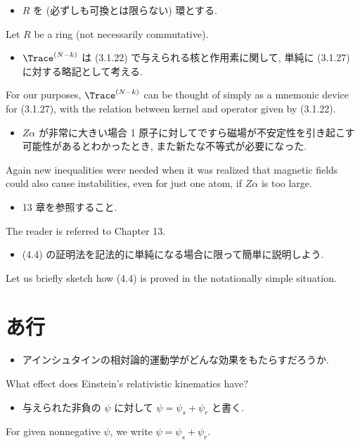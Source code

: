 \documentclass[openany, a4paper, oneside]{jsbook}
\begin{document}
\begin{itemize}
\item $R$ を (必ずしも可換とは限らない) 環とする.
\end{itemize}
Let $R$ be a ring (not necessarily commutative).

\begin{itemize}
\item $\Trace^{(N-k)}$ は (3.1.22) で与えられる核と作用素に関して, 単純に (3.1.27) に対する略記として考える. \cite{LiebSeiringer1}
\end{itemize}
For our purposes, $\Trace^{(N-k)}$ can be thought of simply as a mnemonic device for (3.1.27),
with the relation between kernel and operator given by (3.1.22).

\begin{itemize}
\item $Z \alpha$ が非常に大きい場合 1 原子に対してですら磁場が不安定性を引き起こす可能性があるとわかったとき, また新たな不等式が必要になった. \cite{LiebSeiringer1}
\end{itemize}
Again new inequalities were needed when it was realized that magnetic fields
could also cause instabilities, even for just one atom, if $Z \alpha$ is too large.

\begin{itemize}
\item 13 章を参照すること. \cite{LiebSeiringer1}
\end{itemize}
The reader is referred to Chapter 13.

\begin{itemize}
\item (4.4) の証明法を記法的に単純になる場合に限って簡単に説明しよう.
\end{itemize}
Let us briefly sketch how (4.4) is proved in the notationally simple situation.
\section{あ行}

\begin{itemize}
\item アインシュタインの相対論的運動学がどんな効果をもたらすだろうか. \cite{LiebSeiringer1}
\end{itemize}
What effect does Einstein's relativistic kinematics have?

\begin{itemize}
\item 与えられた非負の $\psi$ に対して $\psi = \psi_{s} + \psi_{r}$ と書く. \cite{LiebSeiringer1}
\end{itemize}
For given nonnegative $\psi$, we write $\psi = \psi_{s} + \psi_{r}$.
\end{document}
